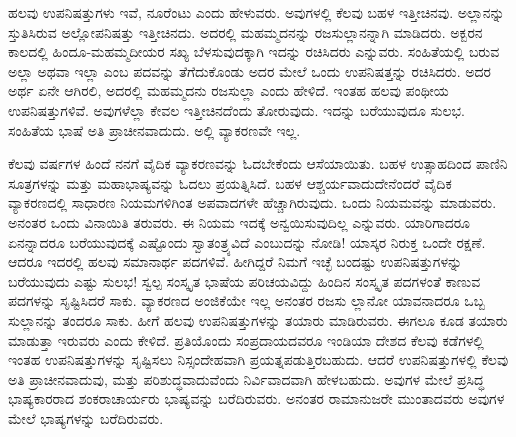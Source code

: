 ಹಲವು ಉಪನಿಷತ್ತುಗಳು ಇವೆ, ನೂರೆಂಟು ಎಂದು ಹೇಳುವರು. ಅವುಗಳಲ್ಲಿ ಕೆಲವು ಬಹಳ ಇತ್ತೀಚಿನವು. ಅಲ್ಲಾನನ್ನು ಸ್ತುತಿಸಿರುವ ಅಲ್ಲೋಪನಿಷತ್ತು ಇತ್ತೀಚಿನದು. ಅದರಲ್ಲಿ ಮಹಮ್ಮದನನ್ನು ರಜಸುಲ್ಲಾನನ್ನಾಗಿ ಮಾಡಿದರು. ಅಕ್ಬರನ ಕಾಲದಲ್ಲಿ ಹಿಂದೂ-ಮಹಮ್ಮದೀಯರ ಸಖ್ಯ ಬೆಳಸುವುದಕ್ಕಾಗಿ ಇದನ್ನು ರಚಿಸಿದರು ಎನ್ನುವರು. ಸಂಹಿತೆಯಲ್ಲಿ ಬರುವ ಅಲ್ಲಾ ಅಥವಾ ಇಲ್ಲಾ ಎಂಬ ಪದವನ್ನು ತೆಗೆದುಕೊಂಡು ಅದರ ಮೇಲೆ ಒಂದು ಉಪನಿಷತ್ತನ್ನು ರಚಿಸಿದರು. ಅದರ ಅರ್ಥ ಏನೇ ಆಗಿರಲಿ, ಅದರಲ್ಲಿ ಮಹಮ್ಮದನು ರಜಸುಲ್ಲಾ ಎಂದು ಹೇಳಿದೆ. ಇಂತಹ ಹಲವು ಪಂಥೀಯ ಉಪನಿಷತ್ತುಗಳಿವೆ. ಅವುಗಳೆಲ್ಲಾ ಕೇವಲ ಇತ್ತೀಚಿನದೆಂದು ತೋರುವುದು. ಇದನ್ನು ಬರೆಯುವುದೂ ಸುಲಭ. ಸಂಹಿತೆಯ ಭಾಷೆ ಅತಿ ಪ್ರಾಚೀನವಾದುದು. ಅಲ್ಲಿ ವ್ಯಾಕರಣವೇ ಇಲ್ಲ.

ಕೆಲವು ವರ್ಷಗಳ ಹಿಂದೆ ನನಗೆ ವೈದಿಕ ವ್ಯಾಕರಣವನ್ನು ಓದಬೇಕೆಂದು ಆಸೆಯಾಯಿತು. ಬಹಳ ಉತ್ಸಾಹದಿಂದ ಪಾಣಿನಿ ಸೂತ್ರಗಳನ್ನು ಮತ್ತು ಮಹಾಭಾಷ್ಯವನ್ನು ಓದಲು ಪ್ರಯತ್ನಿಸಿದೆ. ಬಹಳ ಆಶ್ಚರ್ಯವಾದುದೇನೆಂದರೆ ವೈದಿಕ ವ್ಯಾಕರಣದಲ್ಲಿ ಸಾಧಾರಣ ನಿಯಮಗಳಿಗಿಂತ ಅಪವಾದಗಳೇ ಹೆಚ್ಚಾಗಿರುವುದು. ಒಂದು ನಿಯಮವನ್ನು ಮಾಡುವರು. ಅನಂತರ ಒಂದು ವಿನಾಯಿತಿ ತರುವರು. ಈ ನಿಯಮ ಇದಕ್ಕೆ ಅನ್ವಯಿಸುವುದಿಲ್ಲ ಎನ್ನುವರು. ಯಾರಿಗಾದರೂ ಏನನ್ನಾದರೂ ಬರೆಯುವುದಕ್ಕೆ ಎಷ್ಟೊಂದು ಸ್ವಾತಂತ್ರ್ಯವಿದೆ ಎಂಬುದನ್ನು ನೋಡಿ! ಯಾಸ್ಕರ ನಿರುಕ್ತ ಒಂದೇ ರಕ್ಷಣೆ. ಆದರೂ ಇದರಲ್ಲಿ ಹಲವು ಸಮಾನಾರ್ಥ ಪದಗಳಿವೆ. ಹೀಗಿದ್ದರೆ ನಿಮಗೆ ಇಚ್ಛೆ ಬಂದಷ್ಟು ಉಪನಿಷತ್ತುಗಳನ್ನು ಬರೆಯುವುದು ಎಷ್ಟು ಸುಲಭ! ಸ್ವಲ್ಪ ಸಂಸ್ಕೃತ ಭಾಷೆಯ ಪರಿಚಯವಿದ್ದು ಹಿಂದಿನ ಸಂಸ್ಕೃತ ಪದಗಳಂತೆ ಕಾಣುವ ಪದಗಳನ್ನು ಸೃಷ್ಟಿಸಿದರೆ ಸಾಕು. ವ್ಯಾಕರಣದ ಅಂಜಿಕೆಯೇ ಇಲ್ಲ ಅನಂತರ ರಜಸು ಲ್ಲಾನೋ ಯಾವನಾದರೂ ಒಬ್ಬ ಸುಲ್ಲಾನನ್ನು ತಂದರೂ ಸಾಕು. ಹೀಗೆ ಹಲವು ಉಪನಿಷತ್ತುಗಳನ್ನು ತಯಾರು ಮಾಡಿರುವರು. ಈಗಲೂ ಕೂಡ ತಯಾರು ಮಾಡುತ್ತಾ ಇರುವರು ಎಂದು ಕೇಳಿದೆ. ಪ್ರತಿಯೊಂದು ಸಂಪ್ರದಾಯದವರೂ ಇಂಡಿಯಾ ದೇಶದ ಕೆಲವು ಕಡೆಗಳಲ್ಲಿ ಇಂತಹ ಉಪನಿಷತ್ತುಗಳನ್ನು ಸೃಷ್ಟಿಸಲು ನಿಸ್ಸಂದೇಹವಾಗಿ ಪ್ರಯತ್ನಪಡುತ್ತಿರಬಹುದು. ಆದರೆ ಉಪನಿಷತ್ತುಗಳಲ್ಲಿ ಕೆಲವು ಅತಿ ಪ್ರಾಚೀನವಾದುವು, ಮತ್ತು ಪರಿಶುದ್ಧವಾದುವೆಂದು ನಿರ್ವಿವಾದವಾಗಿ ಹೇಳಬಹುದು. ಅವುಗಳ ಮೇಲೆ ಪ್ರಸಿದ್ಧ ಭಾಷ್ಯಕಾರರಾದ ಶಂಕರಾಚಾರ್ಯರು ಭಾಷ್ಯವನ್ನು ಬರೆದಿರುವರು. ಅನಂತರ ರಾಮಾನುಜರೇ ಮುಂತಾದವರು ಅವುಗಳ ಮೇಲೆ ಭಾಷ್ಯಗಳನ್ನು ಬರೆದಿರುವರು.


